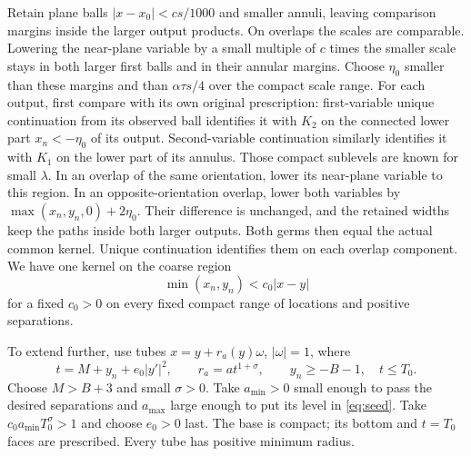 \documentclass[11pt]{article}
\theoremstyle{definition}\newtheorem{definition}[theorem]{Definition}
\theoremstyle{remark}\newtheorem{remark}[theorem]{Remark}
\begin{document}
Retain plane balls $|x-x_0|<cs/1000$ and smaller annuli, leaving
comparison margins inside the larger output products.
On overlaps the scales are comparable. Lowering the near-plane variable
by a small multiple of $c$ times the smaller scale stays in both larger
first balls and in their annular margins. Choose $\eta_0$ smaller than
these margins and than $\alpha\tau s/4$ over the compact scale range.
For each output, first compare with its own original prescription:
first-variable unique continuation from its observed ball identifies it
with $K_2$ on the connected lower part $x_n<-\eta_0$ of its output.
Second-variable continuation similarly identifies it with $K_1$ on the
lower part of its annulus. Those compact sublevels are known for small
$\lambda$. In an overlap of the same orientation, lower its near-plane
variable to this region. In an opposite-orientation overlap, lower both
variables by $\max(x_n,y_n,0)+2\eta_0$. Their difference is unchanged,
and the retained widths keep the paths inside both larger outputs.
Both germs then equal the actual common kernel. Unique continuation
identifies them on each overlap component. We have one kernel on the
coarse region
\begin{equation}\label{eq:seed}
 \min(x_n,y_n)<c_0|x-y|
\end{equation}
for a fixed $c_0>0$ on every fixed compact range of locations and positive
separations.

To extend further, use tubes $x=y+r_a(y)\omega$, $|\omega|=1$, where
\[
 t=M+y_n+e_0|y'|^2,\qquad r_a=a t^{1+\sigma},\qquad
 y_n\ge-B-1,\quad t\le T_0.
\]
Choose $M>B+3$ and small $\sigma>0$. Take $a_{\min}>0$ small enough to
pass the desired separations and $a_{\max}$ large enough to put its level
in \eqref{eq:seed}. Take $c_0a_{\min}T_0^\sigma>1$ and choose $e_0>0$
last. The base is compact; its bottom and $t=T_0$ faces are prescribed.
Every tube has positive minimum radius.
\end{document}
